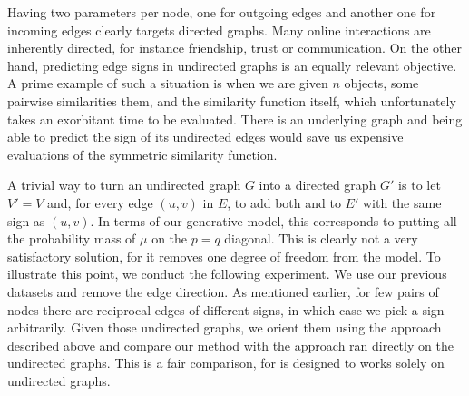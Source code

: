 Having two parameters per node, one for outgoing edges and another one for incoming edges clearly
targets directed graphs. Many online interactions are inherently directed, for instance friendship,
trust or communication. On the other hand, predicting edge signs in undirected graphs is an equally
relevant objective. A prime example of such a situation is when we are given $n$ objects, some
pairwise similarities them, and the similarity function itself, which unfortunately takes an
exorbitant time to be evaluated. There is an underlying graph and being able to predict the sign of
its undirected edges would save us expensive evaluations of the symmetric similarity function.

A trivial way to turn an undirected graph $G$ into a directed graph $G'$ is to let $V'=V$ and, for
every edge $(u,v)$ in $E$, to add both \euv{} and \evu{} to $E'$ with the same sign as $(u,v)$. In
terms of our generative model, this corresponds to putting all the probability mass of $\mu$ on the
$p=q$ diagonal. This is clearly not a very satisfactory solution, for it removes one degree of
freedom from the model. To illustrate this point, we conduct the following experiment. We use our
previous \dssn{} datasets and remove the edge direction. As mentioned earlier, for few pairs of
nodes there are reciprocal edges of different signs, in which case we pick a sign arbitrarily. Given
those undirected graphs, we orient them using the approach described above and compare our method
with the \complowrank{} approach ran directly on the undirected graphs. This is a fair comparison,
for \complowrank{} is designed to works solely on undirected graphs.
